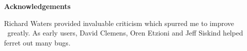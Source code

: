 \medskip

\begin{flushleft}
 \bf Acknowledgements
\end{flushleft}
\smallskip

Richard Waters provided invaluable criticism which spurred me to improve
\iter\ greatly.  As early users, David Clemens, Oren Etzioni and Jeff
Siskind helped ferret out many bugs.





%
%
%






